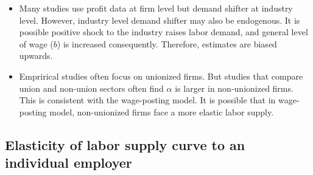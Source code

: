 \documentclass[a4paper, 12pt]{article}
\begin{document}
\begin{itemize}
\item Many studies use profit data at firm level but demand shifter at industry level. However, industry level demand shifter may also be endogenous. It is possible positive shock to the industry raises labor demand, and general level of wage ($b$) is increased consequently. Therefore, estimates are biased upwards.
\item Emprirical studies often focus on unionized firms. But studies that compare union and non-union sectors often find $\alpha$ is larger in non-unionized firms. This is consistent with the wage-posting model. It is possible that in wage-posting model, non-unionized firms face a more elastic labor supply.
\end{itemize}

\subsection{Elasticity of labor supply curve to an individual employer}
\end{document}

